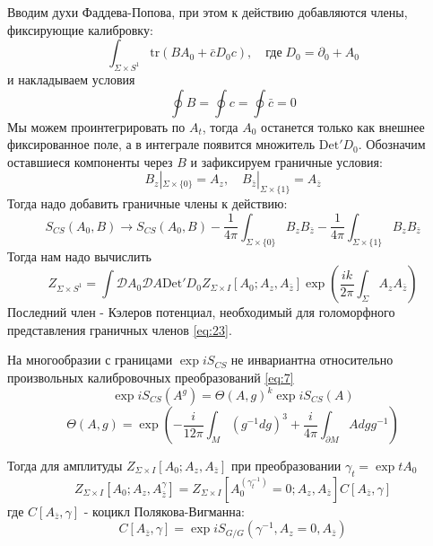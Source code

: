 \documentclass[a4paper,12pt]{article}
\theoremstyle{definition} \newtheorem{Def}{Definition}
\begin{document}
Вводим духи Фаддева-Попова, при этом к действию добавляются члены, фиксирующие калибровку:
\begin{equation}
  \label{eq:20}
  \int_{\Sigma\times S^1}\mathrm{tr}(BA_0+\bar{c}D_0c),\quad \mbox{где} \; D_0=\partial_0+A_0
\end{equation}
и накладываем условия
\begin{equation}
  \label{eq:21}
  \oint B=\oint c=\oint \bar{c}=0
\end{equation}
Мы можем проинтегрировать по $A_t$, тогда $A_0$ останется только как внешнее фиксированное поле, а в интеграле появится множитель $\mathrm{Det}'D_0$. Обозначим оставшиеся компоненты через $B$ и зафиксируем граничные условия:
\begin{equation}
  \label{eq:22}
  B_z|_{\Sigma\times \{0\}}=A_z,\quad B_{\bar{z}}|_{\Sigma\times\{1\}}=A_{\bar z}
\end{equation}
Тогда надо добавить граничные члены к действию:
\begin{equation}
  \label{eq:23}
  S_{CS}(A_0,B)\to S_{CS}(A_0,B)-\frac{1}{4\pi}\int_{\Sigma\times \{0\}}B_z B_{\bar z}-\frac{1}{4\pi}\int_{\Sigma\times \{1\}}B_z B_{\bar z}
\end{equation}
Тогда нам надо вычислить
\begin{equation}
  \label{eq:24}
  Z_{\Sigma\times S^1}=\int \mathcal{D}A_0\mathcal{D}A \mathrm{Det}'D_0 Z_{\Sigma\times I}[A_0; A_z, A_{\bar z}]\exp\left(\frac{ik}{2\pi}\int_{\Sigma}A_z A_{\bar z}\right) 
\end{equation}
Последний член - Кэлеров потенциал, необходимый для голоморфного представления граничных членов \eqref{eq:23}.

На многообразии с границами $\exp iS_{CS}$ не инвариантна относительно произвольных калибровочных преобразований \eqref{eq:7}
\begin{equation}
  \label{eq:25}
  \exp iS_{CS}(A^g)=\Theta(A,g)^k \exp iS_{CS}(A)
\end{equation}
\begin{equation}
  \label{eq:26}
  \Theta(A,g)=\exp \left(-\frac{i}{12\pi}\int_M(g^{-1}dg)^3+\frac{i}{4\pi}\int_{\partial M} A dg g^{-1}\right)
\end{equation}

Тогда для амплитуды $Z_{\Sigma\times I}[A_0;A_z,A_{\bar z}]$ при преобразовании $\gamma_t=\exp tA_0$
\begin{equation}
  \label{eq:27}
  Z_{\Sigma\times I}[A_0;A_z,A_{\bar z}^{\gamma}]=Z_{\Sigma\times I}[A_0^{(\gamma_t^{-1})}=0;A_z,A_{\bar z}] C[A_{\bar z},\gamma]
\end{equation}
где $C[A_{\bar z},\gamma]$ - коцикл Полякова-Вигманна:
\begin{equation}
  \label{eq:28}
  C[A_{\bar z},\gamma]=\exp iS_{G/G}(\gamma^{-1},A_z=0,A_{\bar z})
\end{equation}
\end{document}
